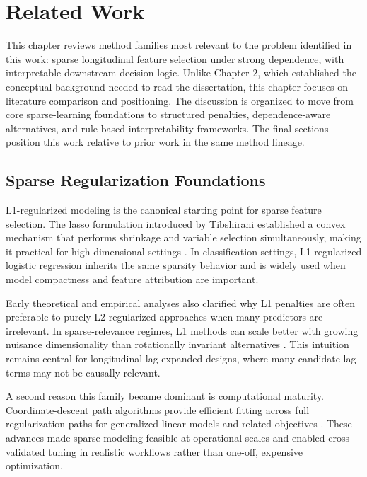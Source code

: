 
\chapter{Related Work}

This chapter reviews method families most relevant to the problem identified in this work: sparse longitudinal feature selection under strong dependence, with interpretable downstream decision logic. Unlike Chapter 2, which established the conceptual background needed to read the dissertation, this chapter focuses on literature comparison and positioning. The discussion is organized to move from core sparse-learning foundations to structured penalties, dependence-aware alternatives, and rule-based interpretability frameworks. The final sections position this work relative to prior work in the same method lineage.

\section{Sparse Regularization Foundations}

L1-regularized modeling is the canonical starting point for sparse feature selection. The lasso formulation introduced by Tibshirani established a convex mechanism that performs shrinkage and variable selection simultaneously, making it practical for high-dimensional settings \autocite{tibshirani1996}. In classification settings, L1-regularized logistic regression inherits the same sparsity behavior and is widely used when model compactness and feature attribution are important.

Early theoretical and empirical analyses also clarified why L1 penalties are often preferable to purely L2-regularized approaches when many predictors are irrelevant. In sparse-relevance regimes, L1 methods can scale better with growing nuisance dimensionality than rotationally invariant alternatives \autocite{AYNg2004Feature}. This intuition remains central for longitudinal lag-expanded designs, where many candidate lag terms may not be causally relevant.

A second reason this family became dominant is computational maturity. Coordinate-descent path algorithms provide efficient fitting across full regularization paths for generalized linear models and related objectives \autocites{fried2010,tay2023}. These advances made sparse modeling feasible at operational scales and enabled cross-validated tuning in realistic workflows rather than one-off, expensive optimization.

